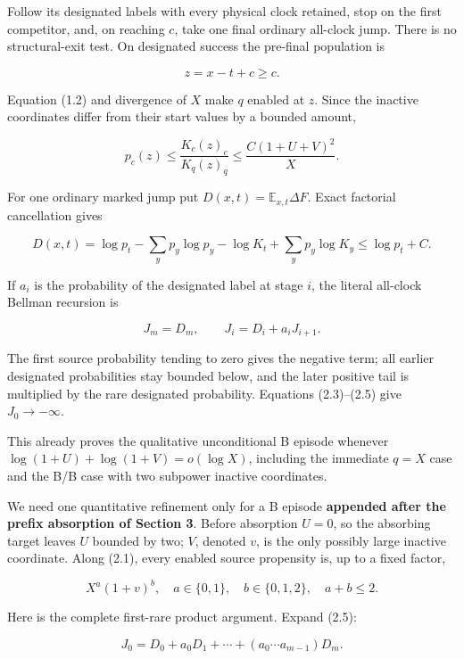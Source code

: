 Follow its designated labels with every physical clock retained, stop on
the first competitor, and, on reaching \(c\), take one final ordinary
all-clock jump. There is no structural-exit test. On designated success
the pre-final population is

\[
                         z=x-t+c\ge c.                \tag{2.2}
\]

Equation (1.2) and divergence of \(X\) make \(q\) enabled at \(z\).
Since the inactive coordinates differ from their start values by a
bounded amount,

\[
 p_c(z)\le \frac{K_c(z)_c}{K_q(z)_q}
       \le \frac{C(1+U+V)^2}{X}.                    \tag{2.3}
\]

For one ordinary marked jump put \(D(x,t)=\mathbb E_{x,t}\Delta F\).
Exact factorial cancellation gives

\[
 D(x,t)=\log p_t-\sum_y p_y\log p_y-\log K_t+\sum_y p_y\log K_y
       \le\log p_t+C.                               \tag{2.4}
\]

If \(a_i\) is the probability of the designated label at stage \(i\),
the literal all-clock Bellman recursion is

\[
 J_m=D_m,\qquad J_i=D_i+a_iJ_{i+1}.                  \tag{2.5}
\]

The first source probability tending to zero gives the negative term;
all earlier designated probabilities stay bounded below, and the later
positive tail is multiplied by the rare designated probability.
Equations (2.3)--(2.5) give \(J_0\to-\infty\).

This already proves the qualitative unconditional B episode whenever
\(\log(1+U)+\log(1+V)=o(\log X)\), including the immediate \(q=X\) case
and the B/B case with two subpower inactive coordinates.

We need one quantitative refinement only for a B episode
\textbf{appended after the prefix absorption of Section 3}. Before
absorption \(U=0\), so the absorbing target leaves \(U\) bounded by two;
\(V\), denoted \(v\), is the only possibly large inactive coordinate.
Along (2.1), every enabled source propensity is, up to a fixed factor,

\[
                         X^a(1+v)^b,
 \quad a\in\{0,1\},\quad b\in\{0,1,2\},\quad a+b\le2. \tag{2.6}
\]

Here is the complete first-rare product argument. Expand (2.5):

\[
 J_0=D_0+a_0D_1+\cdots+
             (a_0\cdots a_{m-1})D_m.                \tag{2.6a}
\]

